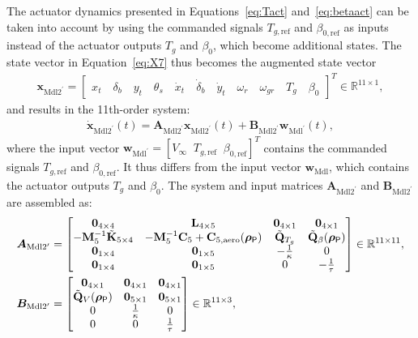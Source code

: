     The actuator dynamics presented in Equations~\eqref{eq:Tact} and~\eqref{eq:betaact} can be taken into account by using the commanded signals $T_{g,\text{ref}}$ and $\beta_{0,\text{ref}}$ as inputs instead of the actuator outputs \(T_g\) and \(\beta_0\), which become additional states. The state vector in Equation~\eqref{eq:X7} thus becomes the augmented state vector %
    \begin{align} \label{eq:11}
        \bm{x}_{\text{Mdl2}^\prime} = \begin{bmatrix} x_t \quad \delta_b \quad y_t \quad \theta_s \quad \dot{x}_t \quad \dot{\delta}_b \quad \dot{y}_t \quad \omega_r \quad \omega_{gr} \quad T_g \quad \beta_0 \end{bmatrix}^T \in \mathbb{R}^{11 \times 1},
    \end{align}
    and results in the 11th-order system:
    \begin{align*}
        \dot{\bm{x}}_{\text{Mdl2}^{\prime}}(t) = \bm{A}_{\text{Mdl2}^{\prime}} \bm{x}_{\text{Mdl2}^{\prime}}(t) + \bm{B}_{\text{Mdl2}^{\prime}} \bm{w}_{\text{Mdl}^\prime}(t),
    \end{align*}
    where the input vector \(\bm{w}_{\text{Mdl}^\prime} = [V_{\infty} \;\; T_{g,\text{ref}} \;\; \beta_{0,\text{ref}}]^T\) contains the commanded signals $T_{g,\text{ref}}$ and $\beta_{0,\text{ref}}$. It thus differs from the input vector $\bm{w}_{\text{Mdl}}$, which contains the actuator outputs $T_g$ and $\beta_0$. The system and input matrices \(\bm{A}_{\text{Mdl2}^{\prime}}\) and \(\bm{B}_{\text{Mdl2}^{\prime}}\) are assembled as:
    \begin{equation} \label{eq:11thorder}
        \begin{aligned}
            \bm{A}_{\text{Mdl2}^{\prime}} &= \begin{bmatrix}
                \bm{0}_{4 \times 4} & \mathbf{L}_{4 \times 5} & \bm{0}_{4 \times 1} &  \bm{0}_{4 \times 1}\\
                -\mathbf{M}_5^{-1}\tilde{\mathbf{K}}_{5 \times 4} & -\mathbf{M}_5^{-1}\mathbf{C}_5 + \mathbf{C}_{5,\text{aero}}(\bm{\rho}_{\mathsf{P}}) & \tilde{\mathbf{Q}}_{T_g} & \tilde{\mathbf{Q}}_{\beta}(\bm{\rho}_{\mathsf{P}})\\
                \bm{0}_{1 \times 4} & \bm{0}_{1 \times 5} & -\frac{1}{\kappa} & 0\\
                \bm{0}_{1 \times 4} & \bm{0}_{1 \times 5} & 0 & -\frac{1}{\tau}
            \end{bmatrix} \in \mathbb{R}^{11 \times 11},\\
            \bm{B}_{\text{Mdl2}^{\prime}} &= \begin{bmatrix}
                \bm{0}_{4 \times 1} & \bm{0}_{4 \times 1} & \bm{0}_{4 \times 1}\\
                \tilde{\mathbf{Q}}_V (\bm{\rho}_{\mathsf{P}}) & \bm{0}_{5 \times 1} & \bm{0}_{5 \times 1}\\
                0 & \frac{1}{\kappa} & 0\\
                0 & 0 & \frac{1}{\tau}
            \end{bmatrix} \in \mathbb{R}^{11 \times 3},
        \end{aligned}
    \end{equation}
